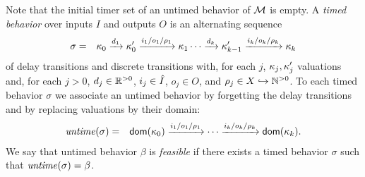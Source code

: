 Note that the initial timer set of an untimed behavior of ${\mathcal M}$ is empty.
%
A \emph{timed behavior} over inputs $I$ and outputs $O$ is an alternating sequence
\begin{eqnarray}
\label{timedbehavior}
\sigma & = & \kappa_0 \xrightarrow{d_1} \kappa'_0 \xrightarrow{i_1/o_1/\rho_1} \kappa_1 \cdots
\xrightarrow{d_k} \kappa'_{k-1} \xrightarrow{i_k/o_k/\rho_k} \kappa_{k}
\end{eqnarray}
of delay transitions and discrete transitions with, for each $j$,
$\kappa_j, \kappa'_j$ valuations and,
for each $j>0$,  $d_j \in {\mathbb R}^{> 0}$, $i_j \in \hat{I}$, $o_j \in O$, and $\rho_j \in X \hookrightarrow {\mathbb N}^{>0}$.
To each timed behavior $\sigma$ we associate an untimed behavior by forgetting the
delay transitions and by replacing valuations by their domain:
\begin{eqnarray*}
\mathit{untime}(\sigma) & = & {\textsf{dom}}(\kappa_0) \xrightarrow{i_1/o_1/\rho_1}  \cdots \xrightarrow{i_k/o_k/\rho_k} {\textsf{dom}}(\kappa_k).
\end{eqnarray*}
We say that untimed behavior $\beta$ is \emph{feasible} if there exists a timed behavior $\sigma$ such that $\mathit{untime}(\sigma) = \beta$.

